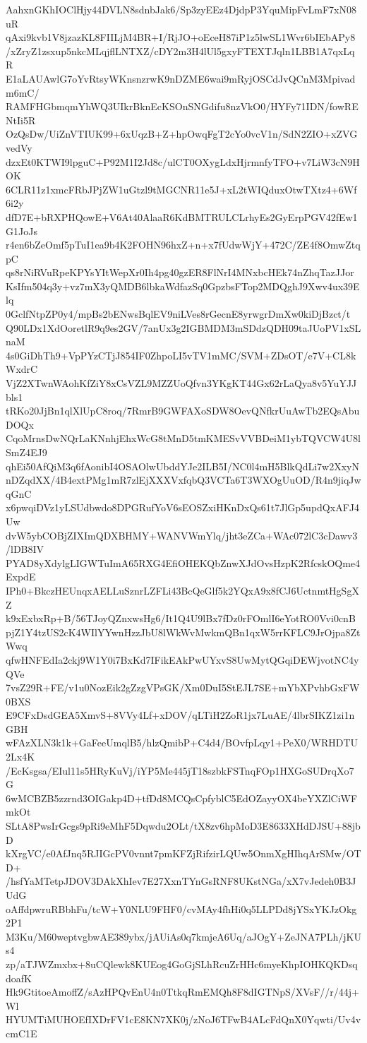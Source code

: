 AahxnGKhIOClHjy44DVLN8sdnbJak6/Sp3zyEEz4DjdpP3YquMipFvLmF7xN08uR
qAxi9kvb1V8jzazKL8FIILjM4BR+I/RjJO+oEceH87iP1z5lwSL1Wvr6bIEbAPy8
/xZryZ1zsxup5nkcMLqjflLNTXZ/cDY2m3H4lUl5gxyFTEXTJqln1LBB1A7qxLqR
E1aLAUAwlG7oYvRtsyWKnsnzrwK9nDZME6wai9mRyjOSCdJvQCnM3Mpivadm6mC/
RAMFHGbmqmYhWQ3UIkrBknEcKSOnSNGdifu8nzVkO0/HYFy71IDN/fowRENtIi5R
OzQsDw/UiZnVTIUK99+6xUqzB+Z+hpOwqFgT2cYo0vcV1n/SdN2ZIO+xZVGvedVy
dzxEt0KTWI9lpguC+P92M1I2Jd8c/ulCT0OXygLdxHjrmnfyTFO+v7LiW3cN9HOK
6CLR11z1xmcFRbJPjZW1uGtzl9tMGCNR11e5J+xL2tWIQduxOtwTXtz4+6Wf6i2y
dfD7E+bRXPHQowE+V6At40AlaaR6KdBMTRULCLrhyEs2GyErpPGV42fEw1G1JoJs
r4en6bZeOmf5pTuI1ea9b4K2FOHN96hxZ+n+x7fUdwWjY+472C/ZE4f8OmwZtqpC
qs8rNiRVuRpeKPYsYItWepXr0Ih4pg40gzER8FlNrI4MNxbcHEk74nZhqTazJJor
KsIfm504q3y+vz7mX3yQMDB6lbkaWdfazSq0GpzbsFTop2MDQghJ9Xwv4ux39Elq
0GclfNtpZP0y4/mpBs2bENwsBqlEV9niLVes8rGecnE8yrwgrDmXw0kiDjBzct/t
Q90LDx1XdOoretlR9q9es2GV/7anUx3g2IGBMDM3mSDdzQDH09taJUoPV1xSLnaM
4s0GiDhTh9+VpPYzCTjJ854IF0ZhpoLI5vTV1mMC/SVM+ZDsOT/e7V+CL8kWxdrC
VjZ2XTwnWAohKfZiY8xCsVZL9MZZUoQfvn3YKgKT44Gx62rLaQya8v5YuYJJbls1
tRKo20JjBn1qlXlUpC8roq/7RmrB9GWFAXoSDW8OevQNfkrUuAwTb2EQsAbuDOQx
CqoMrnsDwNQrLaKNnhjEhxWcG8tMnD5tmKMESvVVBDeiM1ybTQVCW4U8lSmZ4EJ9
qhEi50AfQiM3q6fAonibI4OSAOlwUbddYJe2ILB5I/NC0l4mH5BlkQdLi7w2XxyN
nDZqdXX/4B4extPMg1mR7zlEjXXXVxfqbQ3VCTa6T3WXOgUuOD/R4n9jiqJwqGnC
x6pwqiDVz1yLSUdbwdo8DPGRufYoV6sEOSZxiHKnDxQs61t7JlGp5updQxAFJ4Uw
dvW5ybCOBjZIXImQDXBHMY+WANVWmYlq/jht3eZCa+WAc072lC3cDawv3/lDB8IV
PYAD8yXdylgLIGWTuImA65RXG4EfiOHEKQbZnwXJdOvsHzpK2RfcskOQme4ExpdE
IPh0+BkczHEUnqxAELLuSznrLZFLi43BcQeGlf5k2YQxA9x8fCJ6UctnmtHgSgXZ
k9xExbxRp+B/56TJoyQZnxwsHg6/It1Q4U9lBx7fDz0rFOmlI6eYotRO0Vvi0cnB
pjZ1Y4tzUS2cK4WIlYYwnHzzJbU8lWkWvMwkmQBn1qxW5rrKFLC9JrOjpa8ZtWwq
qfwHNFEdIa2ckj9W1Y0i7BxKd7IFikEAkPwUYxvS8UwMytQGqiDEWjvotNC4yQVe
7vsZ29R+FE/v1u0NozEik2gZzgVPsGK/Xm0DuI5StEJL7SE+mYbXPvhbGxFW0BXS
E9CFxDsdGEA5XmvS+8VVy4Lf+xDOV/qLTiH2ZoR1jx7LuAE/4lbrSIKZ1zi1nGBH
wFAzXLN3k1k+GaFeeUmqlB5/hlzQmibP+C4d4/BOvfpLqy1+PeX0/WRHDTU2Lx4K
/EcKsgsa/EIul11s5HRyKuVj/iYP5Me445jT18szbkFSTnqFOp1HXGoSUDrqXo7G
6wMCBZB5zzrnd3OIGakp4D+tfDd8MCQsCpfyblC5EdOZayyOX4beYXZlCiWFmkOt
SLtA8PwsIrGcgs9pRi9eMhF5Dqwdu2OLt/tX8zv6hpMoD3E8633XHdDJSU+88jbD
kXrgVC/e0AfJnq5RJIGcPV0vnnt7pmKFZjRifzirLQUw5OnmXgHIhqArSMw/OTD+
/hsfYaMTetpJDOV3DAkXhIev7E27XxnTYnGsRNF8UKstNGa/xX7vJedeh0B3JUdG
oAffdpwruRBbhFu/tcW+Y0NLU9FHF0/cvMAy4fhHi0q5LLPDd8jYSxYKJzOkg2P1
M3Ku/M60weptvgbwAE389ybx/jAUiAs0q7kmjeA6Uq/aJOgY+ZeJNA7PLh/jKUs4
zp/aTJWZmxbx+8uCQlewk8KUEog4GoGjSLhRcuZrHHc6myeKhpIOHKQKDsqdoafK
Hk9GtitoeAmoffZ/sAzHPQvEnU4n0TtkqRmEMQh8F8dIGTNpS/XVsF//r/44j+Wl
HYUMTiMUHOEfIXDrFV1cE8KN7XK0j/zNoJ6TFwB4ALcFdQnX0Yqwti/Uv4vcmC1E
